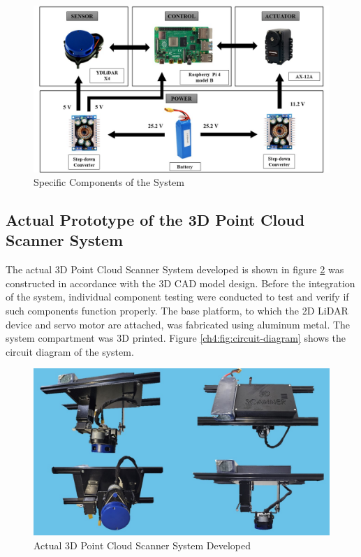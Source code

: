 \begin{figure}[H]
	\centering
	\includegraphics[width=1\textwidth]{Figures/specific-components}
	\caption{Specific Components of the System}
	\label{ch4:fig:specific-components}
\end{figure}


\subsection{Actual Prototype of the 3D Point Cloud Scanner System}

The actual 3D Point Cloud Scanner System developed is shown in figure \ref{ch4:fig:actual-3d-pcss} was constructed in accordance with the 3D CAD model design. Before the integration of the system, individual component testing were conducted to test and verify if such components function properly. The base platform, to which the 2D LiDAR device and servo motor are attached, was fabricated using aluminum metal. The system compartment was 3D printed. Figure \ref{ch4:fig:circuit-diagram} shows the circuit diagram of the system. \\
\begin{figure}[H]
	\centering
	\includegraphics[width=1\textwidth]{Figures/actual-3d-pcss}
	\caption{Actual 3D Point Cloud Scanner System Developed}
	\label{ch4:fig:actual-3d-pcss}
\end{figure}

